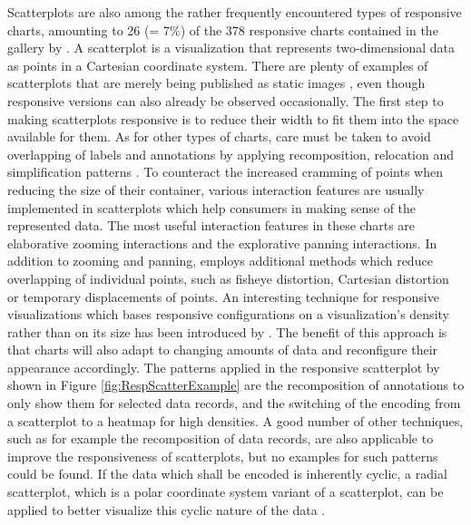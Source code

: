 Scatterplots are also among the rather frequently encountered types of responsive charts, amounting to 26 (= 7\%) of the 378 responsive charts contained in the gallery by \cite{DesignPatternsTradeOffsRespVis}. A scatterplot is a visualization that represents two-dimensional data as points in a Cartesian coordinate system. There are plenty of examples of scatterplots that are merely being published as static images \parencite{Scatter,Scatter2}, even though responsive versions can also already be observed occasionally. The first step to making scatterplots responsive is to reduce their width to fit them into the space available for them. As for other types of charts, care must be taken to avoid overlapping of labels and annotations by applying recomposition, relocation and simplification patterns \parencite{RespScatter,RespScatter2}. To counteract the increased cramming of points when reducing the size of their container, various interaction features are usually implemented in scatterplots which help consumers in making sense of the represented data. The most useful interaction features in these charts are elaborative zooming interactions and the explorative panning interactions. In addition to zooming and panning, \cite{RespVis} employs additional methods which reduce overlapping of individual points, such as fisheye distortion, Cartesian distortion or temporary displacements of points. An interesting technique for responsive visualizations which bases responsive configurations on a visualization's density rather than on its size has been introduced by \cite{NickRabinowitzRDV}. The benefit of this approach is that charts will also adapt to changing amounts of data and reconfigure their appearance accordingly. The patterns applied in the responsive scatterplot by \cite{NickRabinowitzRDV} shown in Figure \ref{fig:RespScatterExample} are the recomposition of annotations to only show them for selected data records, and the switching of the encoding from a scatterplot to a heatmap for high densities. A good number of other techniques, such as for example the recomposition of data records, are also applicable to improve the responsiveness of scatterplots, but no examples for such patterns could be found. If the data which shall be encoded is inherently cyclic, a radial scatterplot, which is a polar coordinate system variant of a scatterplot, can be applied to better visualize this cyclic nature of the data \parencite{RespRadialScatterHLine}. 

